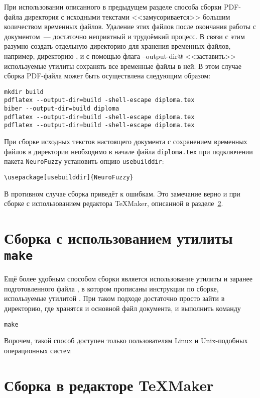 \documentclass[a4paper, 14pt, reqno, oneside]{extbook}
\begin{document}
При использовании описанного в предыдущем разделе способа сборки PDF-файла директория с исходными текстами <<замусоривается>> большим количеством временных файлов. Удаление этих файлов после окончания работы с документом~--- достаточно неприятный и трудоёмкий процесс. В связи с этим разумно создать отдельную директорию для хранения временных файлов, например, директорию \verb@build@, и с помощью флага \verb@--output-dir@ <<заставить>> используемые утилиты сохранять все временные файлы в ней. В этом случае сборка PDF-файла может быть осуществлена следующим образом:
\begin{verbatim}
mkdir build
pdflatex --output-dir=build -shell-escape diploma.tex
biber --output-dir=build diploma
pdflatex --output-dir=build -shell-escape diploma.tex
pdflatex --output-dir=build -shell-escape diploma.tex
\end{verbatim}

\begin{notice}
\label{note:usebuilddir}
    При сборке исходных текстов настоящего документа с сохранением временных файлов в директории \verb@build@ необходимо в начале файла \texttt{diploma.tex} при подключении пакета \texttt{NeuroFuzzy} установить опцию \texttt{usebuilddir}:
\begin{verbatim}
\usepackage[usebuilddir]{NeuroFuzzy}
\end{verbatim}
В противном случае сборка приведёт к ошибкам. Это замечание верно и при сборке с использованием редактора \TeX Maker, описанной в разделе~\ref{sec:texmaker}.
\end{notice}

\section{Сборка с использованием утилиты \texttt{make}}
\label{sec:make}

Ещё более удобным способом сборки является использование утилиты \verb@make@ и заранее подготовленного файла \verb@Makefile@, в котором прописаны инструкции по сборке, используемые утилитой \verb@make@. При таком подходе достаточно просто зайти в директорию, где хранятся \verb@Makefile@ и основной файл документа, и выполнить команду
\begin{verbatim}
make
\end{verbatim}
Впрочем, такой способ доступен только пользователям Linux и \dr Unix-подобных операционных систем

\section{Сборка в редакторе \TeX Maker}
\label{sec:texmaker}
\end{document}
